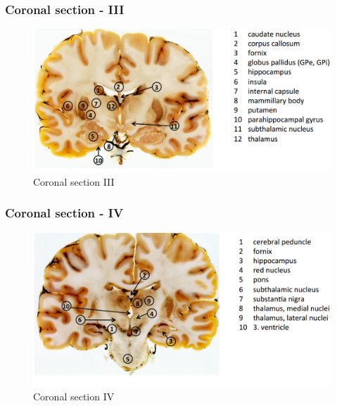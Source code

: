 \documentclass[12pt,article,oneside,a4paper]{memoir}
\begin{document}
\subsubsection{Coronal section - III}
\begin{figure}[H]
	\centering
  	\includegraphics[width=\linewidth]{imgs/coronal-section-III-answer.png}
	\caption{Coronal section III}
  	\label{fig:coronalSectionIII-answer}
\end{figure}

\subsubsection{Coronal section - IV}
\begin{figure}[H]
	\centering
  	\includegraphics[width=\linewidth]{imgs/coronal-section-IV-answer.png}
	\caption{Coronal section IV}
  	\label{fig:coronalSectionIV-answer}
\end{figure}
\end{document}
